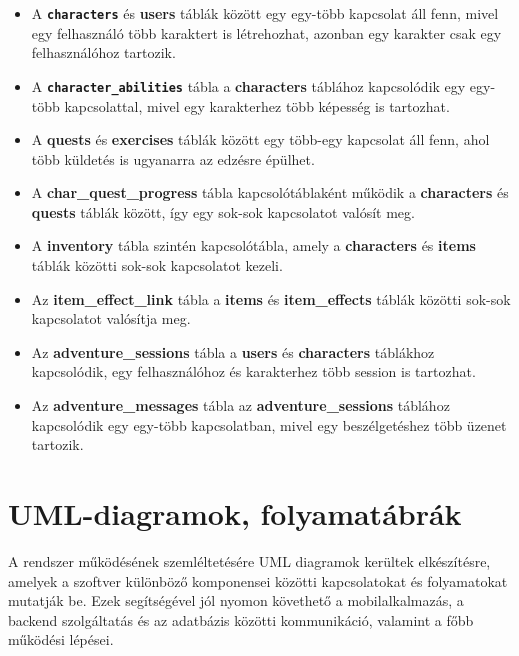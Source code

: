 \documentclass[
]{thesis-ekf}
\theoremstyle{definition}
\theoremstyle{remark}
\begin{document}
\begin{itemize}

    \item
    A \texttt{\textbf{characters}} és \textbf{users} táblák között egy egy-több kapcsolat áll fenn, mivel egy felhasználó több karaktert is létrehozhat, azonban egy karakter csak egy felhasználóhoz tartozik.

    \item
    A \texttt{\textbf{character\_abilities}} tábla a \textbf{characters} táblához kapcsolódik egy egy-több kapcsolattal, mivel egy karakterhez több képesség is tartozhat.

    \item 
    A \textbf{quests} és \textbf{exercises} táblák között egy több-egy kapcsolat áll fenn, ahol több küldetés is ugyanarra az edzésre épülhet.

    \item 
    A \textbf{char\_quest\_progress} tábla kapcsolótáblaként működik a \textbf{characters} és \textbf{quests} táblák között, így egy sok-sok kapcsolatot valósít meg.

    \item 
    A \textbf{inventory} tábla szintén kapcsolótábla, amely a \textbf{characters} és \textbf{items} táblák közötti sok-sok kapcsolatot kezeli.

    \item 
    Az \textbf{item\_effect\_link} tábla a \textbf{items} és \textbf{item\_effects} táblák közötti sok-sok kapcsolatot valósítja meg.

    \item
    Az \textbf{adventure\_sessions} tábla a \textbf{users} és \textbf{characters} táblákhoz kapcsolódik, egy felhasználóhoz és karakterhez több session is tartozhat.

    \item 
    Az \textbf{adventure\_messages} tábla az \textbf{adventure\_sessions} táblához kapcsolódik egy egy-több kapcsolatban, mivel egy beszélgetéshez több üzenet tartozik.

\end{itemize}

\section{UML-diagramok, folyamatábrák}

A rendszer működésének szemléltetésére UML diagramok kerültek elkészítésre, amelyek a szoftver különböző komponensei közötti kapcsolatokat és folyamatokat mutatják be. Ezek segítségével jól nyomon követhető a mobilalkalmazás, a backend szolgáltatás és az adatbázis közötti kommunikáció, valamint a főbb működési lépései.
\end{document}
